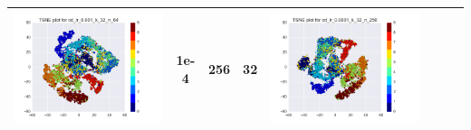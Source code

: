 \documentclass[12pt]{report}
\begin{document}
\begin{table}[H]
\begin{tabular}{ | c | c | c | c || c | c | c| c |}
\begin{minipage}{.3\textwidth}
      \includegraphics[scale=0.25]{cd_lr_0_001_k_32_n_64.png}
    \end{minipage}
	&
    1e-4 & 256 & 32 &
    \begin{minipage}{.3\textwidth}
      \includegraphics[scale=0.25]{cd_lr_0_0001_k_32_n_256.png}
    \end{minipage}
    \\ \hline
  \end{tabular}
\end{table}
\end{document}
